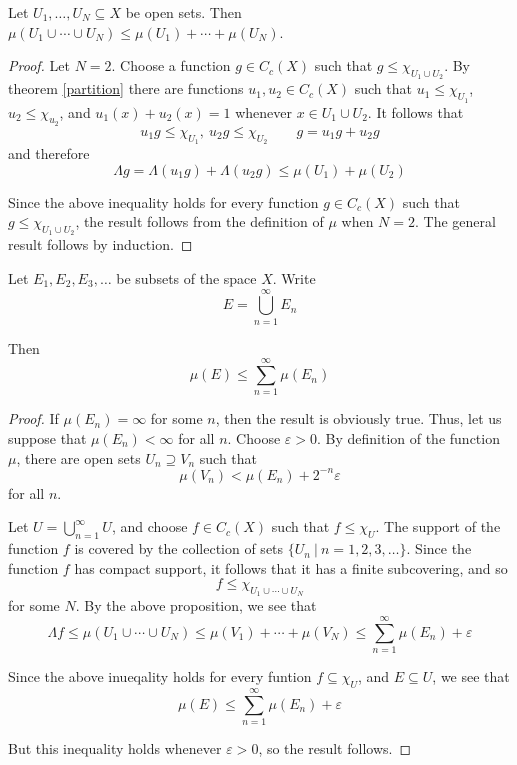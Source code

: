 \begin{proposition}
Let $U_1 , \ldots , U_N\subseteq X$ be open sets.  Then 
$\mu (U_1\cup \cdots \cup U_N) \leq \mu (U_1)+ \cdots +\mu (U_N)$.
\end{proposition}

\begin{proof}
Let $N=2$.  Choose a function $g\in C_c (X)$ such that $g\leq \chi_{U_1\cup U_2}$.  By theorem \ref{partition} there are functions $u_1 , u_2\in C_c (X)$ such that $u_1\leq \chi_{U_1}$, $u_2\leq \chi_{u_2}$, and $u_1(x) + u_2 (x) =1$ whenever $x\in U_1\cup U_2$.  It follows that
$$u_1 g\leq \chi_{U_1},\ u_2g \leq \chi_{U_2} \qquad g=u_1 g + u_2 g$$
and therefore
$$\Lambda g = \Lambda (u_1 g) +\Lambda (u_2 g) \leq \mu (U_1) + \mu (U_2)$$

Since the above inequality holds for every function $g\in C_c (X)$ such that $g\leq \chi_{U_1\cup U_2}$, the result follows from the definition of $\mu$ when $N=2$.  The general result follows by induction.
\end{proof}

\begin{lemma} \label{lem1}
Let $E_1,E_2,E_3,\ldots$ be subsets of the space $X$.    Write
$$E = \bigcup_{n=1}^\infty E_n$$

Then
$$\mu (E) \leq \sum_{n=1}^\infty \mu (E_n)$$
\end{lemma}

\begin{proof}
If $\mu (E_n )=\infty$ for some $n$, then the result is obviously true.  Thus, let us suppose that $\mu (E_n)<\infty$ for all $n$.  Choose $\varepsilon >0$.  By definition of the function $\mu$, there are open sets $U_n \supseteq V_n$ such that
$$\mu (V_n) < \mu (E_n) +2^{-n} \varepsilon$$
for all $n$.

Let $U = \bigcup_{n=1}^\infty U$, and choose $f\in C_c (X)$ such that $f\leq \chi_U$.  The support of the function $f$ is covered by the collection of sets $\{ U_n \ |\ n=1,2,3,\ldots \}$.  Since the function $f$ has compact support, it follows that it has a finite subcovering, and so 
$$f\leq \chi_{U_1 \cup \cdots \cup U_N }$$
for some $N$.  By the above proposition, we see that
$$\Lambda f \leq \mu (U_1 \cup \cdots \cup U_N) \leq \mu(V_1 ) + \cdots + \mu (V_N) \leq \sum_{n=1}^\infty \mu (E_n) + \varepsilon$$

Since the above inueqality holds for every funtion $f\subseteq \chi_U$, and $E\subseteq U$, we see that 
$$\mu (E) \leq \sum_{n=1}^\infty \mu (E_n) +\varepsilon$$

But this inequality holds whenever $\varepsilon >0$, so the result follows.
\end{proof}

